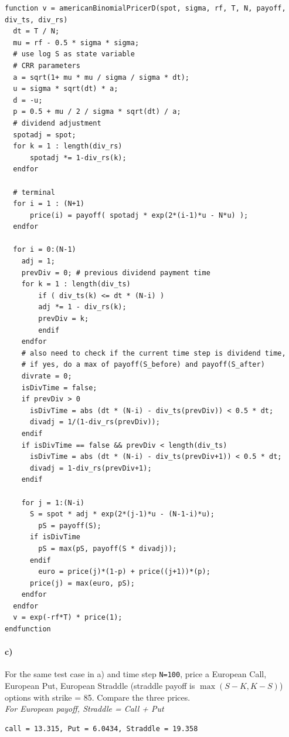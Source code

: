 \documentclass[12pt,a4paper,hidelinks,fleqn]{article}            %
\begin{document}
\begin{small}

\begin{verbatim}
function v = americanBinomialPricerD(spot, sigma, rf, T, N, payoff, div_ts, div_rs)
  dt = T / N;
  mu = rf - 0.5 * sigma * sigma;
  # use log S as state variable
  # CRR parameters
  a = sqrt(1+ mu * mu / sigma / sigma * dt);
  u = sigma * sqrt(dt) * a;
  d = -u;
  p = 0.5 + mu / 2 / sigma * sqrt(dt) / a;
  # dividend adjustment
  spotadj = spot;
  for k = 1 : length(div_rs)
      spotadj *= 1-div_rs(k);
  endfor

  # terminal
  for i = 1 : (N+1)
      price(i) = payoff( spotadj * exp(2*(i-1)*u - N*u) );
  endfor

  for i = 0:(N-1)
    adj = 1;
    prevDiv = 0; # previous dividend payment time
    for k = 1 : length(div_ts)
    	if ( div_ts(k) <= dt * (N-i) )
        adj *= 1 - div_rs(k);
        prevDiv = k;
	    endif
    endfor
    # also need to check if the current time step is dividend time, 
    # if yes, do a max of payoff(S_before) and payoff(S_after)
    divrate = 0;
    isDivTime = false;
    if prevDiv > 0
      isDivTime = abs (dt * (N-i) - div_ts(prevDiv)) < 0.5 * dt;
      divadj = 1/(1-div_rs(prevDiv));
    endif
    if isDivTime == false && prevDiv < length(div_ts)
      isDivTime = abs (dt * (N-i) - div_ts(prevDiv+1)) < 0.5 * dt;
      divadj = 1-div_rs(prevDiv+1);
    endif
    
    for j = 1:(N-i)
      S = spot * adj * exp(2*(j-1)*u - (N-1-i)*u);
	    pS = payoff(S);
      if isDivTime
        pS = max(pS, payoff(S * divadj));
      endif
	    euro = price(j)*(1-p) + price((j+1))*(p);
      price(j) = max(euro, pS);
    endfor
  endfor
  v = exp(-rf*T) * price(1);
endfunction
\end{verbatim}
\end{small}

\vspace{-1cm}
\paragraph{c)} For the same test case in a) and time step \verb-N=100-, 
price a European Call, European Put, European Straddle (straddle payoff is $\max(S-K, K-S)$) options with strike = 85. 
Compare the three prices. \\
\emph{For European payoff, Straddle = Call + Put}
\begin{verbatim}
call = 13.315, Put = 6.0434, Straddle = 19.358
\end{verbatim}
\end{document}
